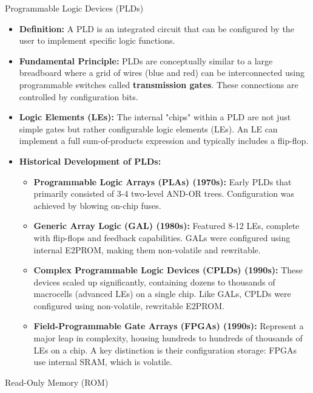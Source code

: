 \documentclass{article}
\begin{document}
\begin{itemize}
Programmable Logic Devices (PLDs)

\begin{itemize}
    \item \textbf{Definition:} A PLD is an integrated circuit that can be configured by the user to implement specific logic functions.
    \item \textbf{Fundamental Principle:} PLDs are conceptually similar to a large breadboard where a grid of wires (blue and red) can be interconnected using programmable switches called \textbf{transmission gates}. These connections are controlled by configuration bits.
    \item \textbf{Logic Elements (LEs):} The internal "chips" within a PLD are not just simple gates but rather configurable logic elements (LEs). An LE can implement a full sum-of-products expression and typically includes a flip-flop.
    \item \textbf{Historical Development of PLDs:}
    \begin{itemize}
        \item \textbf{Programmable Logic Arrays (PLAs) (1970s):} Early PLDs that primarily consisted of 3-4 two-level AND-OR trees. Configuration was achieved by blowing on-chip fuses.
        \item \textbf{Generic Array Logic (GAL) (1980s):} Featured 8-12 LEs, complete with flip-flops and feedback capabilities. GALs were configured using internal E2PROM, making them non-volatile and rewritable.
        \item \textbf{Complex Programmable Logic Devices (CPLDs) (1990s):} These devices scaled up significantly, containing dozens to thousands of macrocells (advanced LEs) on a single chip. Like GALs, CPLDs were configured using non-volatile, rewritable E2PROM.
        \item \textbf{Field-Programmable Gate Arrays (FPGAs) (1990s):} Represent a major leap in complexity, housing hundreds to hundreds of thousands of LEs on a chip. A key distinction is their configuration storage: FPGAs use internal SRAM, which is volatile.
    \end{itemize}
\end{itemize}

Read-Only Memory (ROM)


\end{itemize}
\end{document}
